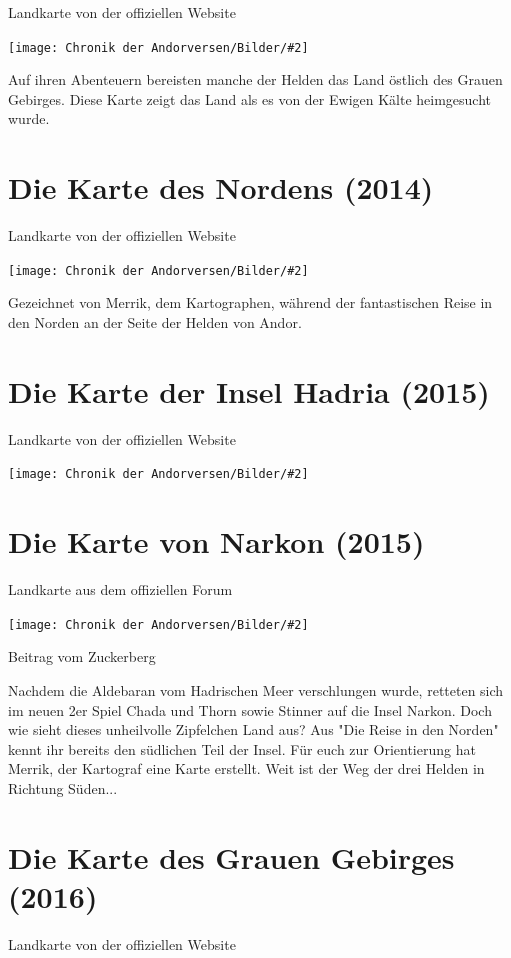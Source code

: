 \documentclass[10pt, a4paper, oneside]{book}
\newcommand{\produkt}[1]{%
    \section{#1}%
    \label{Produkt: #1}%
}
\newcommand{\bildmitts}[2][height=0.32\textwidth,width=0.48\textwidth,keepaspectratio]{%
    \begin{center}
        \texttt{[image: Chronik der Andorversen/Bilder/\#2]}
    \end{center}
}
\begin{document}
\begin{center}
    Landkarte von der offiziellen Website
\end{center}

\bildmitts[width=\textwidth]{Die Karte vom Land der Steppe.jpg}


Auf ihren Abenteuern bereisten manche der Helden das Land östlich des Grauen Gebirges. Diese Karte zeigt das Land als es von der Ewigen Kälte heimgesucht wurde.


\newpage
\produkt{Die Karte des Nordens (2014)}

\begin{center}
    Landkarte von der offiziellen Website
\end{center}

\bildmitts[width=\textwidth]{Die Karte des Nordens.jpg}

Gezeichnet von Merrik, dem Kartographen, während der fantastischen Reise in den Norden an der Seite der Helden von Andor.


\newpage
\produkt{Die Karte der Insel Hadria (2015)}

\begin{center}
    Landkarte von der offiziellen Website
\end{center}

\bildmitts[width=\textwidth]{Die Karte der Insel Hadria.jpg}



\newpage
\produkt{Die Karte von Narkon (2015)}

\begin{center}
    Landkarte aus dem offiziellen Forum
\end{center}

\bildmitts[width=0.9\textwidth]{Die Karte von Narkon.jpeg}

\begin{center}
    Beitrag vom Zuckerberg
\end{center}

Nachdem die Aldebaran vom Hadrischen Meer verschlungen wurde, retteten sich im neuen 2er Spiel Chada und Thorn sowie Stinner auf die Insel Narkon. Doch wie sieht dieses unheilvolle Zipfelchen Land aus? Aus "Die Reise in den Norden" kennt ihr bereits den südlichen Teil der Insel. Für euch zur Orientierung hat Merrik, der Kartograf eine Karte erstellt. Weit ist der Weg der drei Helden in Richtung Süden...


\newpage
\produkt{Die Karte des Grauen Gebirges (2016)}

\begin{center}
    Landkarte von der offiziellen Website
\end{center}
\end{document}
